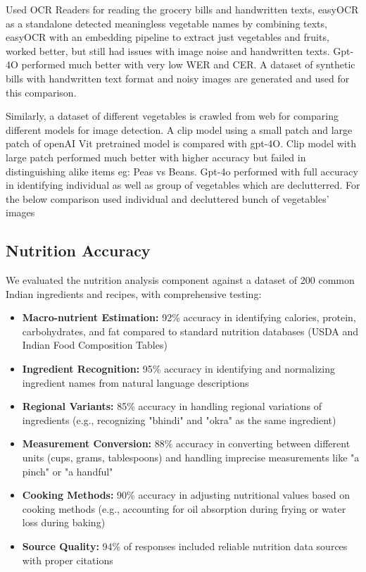 \documentclass{ecai}
\begin{document}
Used OCR Readers for reading the grocery bills and handwritten texts, easyOCR as a standalone detected meaningless vegetable names by combining texts, easyOCR with an embedding pipeline to extract just vegetables and fruits, worked better, but still had issues with image noise and handwritten texts. Gpt-4O performed much better with very low WER and CER. A dataset of synthetic bills with handwritten text format and noisy images are generated and used for this comparison.

Similarly, a dataset of different vegetables is crawled from web for comparing different models for image detection. A clip model using a small patch and large patch of openAI Vit pretrained model is compared with gpt-4O.
Clip model with large patch performed much better with higher accuracy but failed in distinguishing alike items eg: Peas vs Beans. Gpt-4o performed with full accuracy in identifying individual as well as group of vegetables which are declutterred. For the below comparison used individual and decluttered bunch of vegetables’ images

\subsection{Nutrition Accuracy}

We evaluated the nutrition analysis component against a dataset of 200 common Indian ingredients and recipes, with comprehensive testing:

\begin{itemize}[noitemsep,topsep=0pt]
    \item \textbf{Macro-nutrient Estimation:} 92\% accuracy in identifying calories, protein, carbohydrates, and fat compared to standard nutrition databases (USDA and Indian Food Composition Tables)
    \item \textbf{Ingredient Recognition:} 95\% accuracy in identifying and normalizing ingredient names from natural language descriptions
    \item \textbf{Regional Variants:} 85\% accuracy in handling regional variations of ingredients (e.g., recognizing "bhindi" and "okra" as the same ingredient)
    \item \textbf{Measurement Conversion:} 88\% accuracy in converting between different units (cups, grams, tablespoons) and handling imprecise measurements like "a pinch" or "a handful"
    \item \textbf{Cooking Methods:} 90\% accuracy in adjusting nutritional values based on cooking methods (e.g., accounting for oil absorption during frying or water loss during baking)
    \item \textbf{Source Quality:} 94\% of responses included reliable nutrition data sources with proper citations
\end{itemize}
\end{document}
